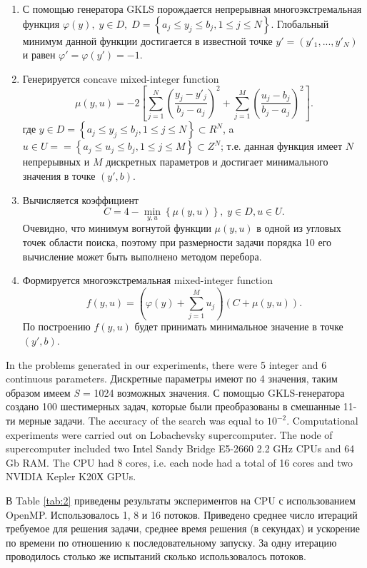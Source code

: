 \documentclass{llncs}
\begin{document}
\begin{enumerate}
	\item С помощью генератора GKLS порождается непрерывная многоэкстремальная функция $\varphi(y), \; y\in D, \; D = \left\{ a_j\leq y_j\leq b_j, 1\leq j \leq N \right\}$. Глобальный минимум данной функции достигается в известной точке $y'=(y'_1,...,y'_N)$ и равен $\varphi'=\varphi(y')=-1$.
	\item Генерируется concave mixed-integer function 
	\[
			\mu(y,u) = -2 \left[ \sum_{j=1}^N \left( \frac{y_j - y'_j}{b_j-a_j} \right)^2 + \sum_{j=1}^M \left( \frac{u_j - b_j}{b_j-a_j} \right)^2 \right].
	\]
	где $y\in D = \left\{ a_j\leq y_j\leq b_j, 1\leq j \leq N \right\} \subset R^N$, a $u\in U = = \left\{ a_j\leq u_j\leq b_j, 1\leq j \leq M \right\} \subset Z^N$; т.е. данная функция имеет $N$ непрерывных и $M$ дискретных параметров и достигает минимального значения в точке $(y',b)$.
	\item Вычисляется коэффициент 
	\[
	C = 4 - \min_{y,u} \left\{ \mu(y,u) \right\}, \; y\in D, u \in U.
	\]
	Очевидно, что минимум вогнутой функции $\mu(y,u)$ в одной из угловых точек области поиска, поэтому при размерности задачи порядка 10 его вычисление может быть выполнено методом перебора.
	\item Формируется многоэкстремальная mixed-integer function 
	\[
	f(y,u) = \left(\varphi(y) + \sum_{j=1}^M{u_j}\right)\left(C + \mu(y,u)\right).
	\]
	По построению $f(y,u)$  будет принимать минимальное значение в точке $(y',b)$.
	
\end{enumerate}


In the problems generated in our experiments, there were 5 integer  and 6 continuous parameters. Дискретные параметры имеют по 4 значения, таким образом имеем \textit{S} = 1024 возможных значения. С помощью GKLS-генератора создано 100 шестимерных задач, которые были преобразованы в смешанные 11-ти мерные задачи. The accuracy of the search was equal to $10^{-2}$.   
Computational experiments were carried out on Lobachevsky supercomputer. The node of 
supercomputer included two Intel Sandy Bridge E5-2660 2.2 GHz CPUs and 64 Gb RAM. The 
CPU had 8 cores, i.e. each node had a total of 16 cores and two NVIDIA Kepler K20Х GPUs.



В Table \ref{tab:2} приведены результаты экспериментов на CPU с использованием OpenMP. Использовалось 1, 8 и 16 потоков. Приведено среднее число итераций требуемое для решения задачи, среднее время решения (в секундах) и ускорение по времени по отношению к последовательному запуску. За одну итерацию проводилось столько же испытаний сколько использовалось потоков.
\end{document}
